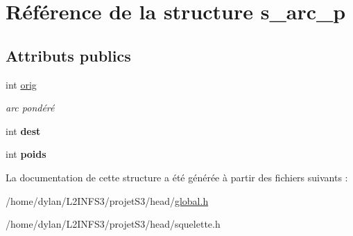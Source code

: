 \hypertarget{structs__arc__p}{}\section{Référence de la structure s\+\_\+arc\+\_\+p}
\label{structs__arc__p}
\subsection*{Attributs publics}
\begin{DoxyCompactItemize}
\item 
\mbox{\label{structs__arc__p_a7e29f3e22b1f325c3f34750c98b6f3a4}} 
int \hyperlink{structs__arc__p_a7e29f3e22b1f325c3f34750c98b6f3a4}{orig}
\begin{DoxyCompactList}\small\item\em arc pondéré \end{DoxyCompactList}\item 
\mbox{\label{structs__arc__p_ad5ac3f6e18353eae50ec9d72bd3d4224}} 
int {\bfseries dest}
\item 
\mbox{\label{structs__arc__p_abc56609c28f29ed0742e8790d38e4b0f}} 
int {\bfseries poids}
\end{DoxyCompactItemize}


La documentation de cette structure a été générée à partir des fichiers suivants \+:\begin{DoxyCompactItemize}
\item 
/home/dylan/\+L2\+I\+N\+F\+S3/projet\+S3/head/\hyperlink{global_8h}{global.\+h}\item 
/home/dylan/\+L2\+I\+N\+F\+S3/projet\+S3/head/squelette.\+h\end{DoxyCompactItemize}
